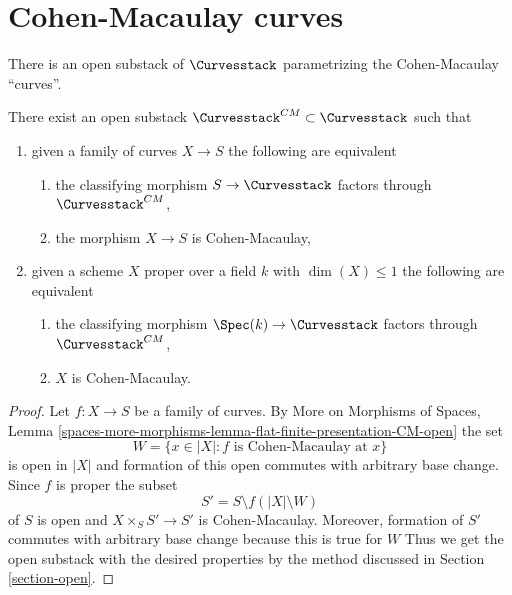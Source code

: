 \section{Cohen-Macaulay curves}
\label{section-CM}

\noindent
There is an open substack of $\Curvesstack$ parametrizing
the Cohen-Macaulay ``curves''.

\begin{lemma}
\label{lemma-CM-curves}
There exist an open substack $\Curvesstack^{CM} \subset \Curvesstack$
such that
\begin{enumerate}
\item given a family of curves $X \to S$ the following are equivalent
\begin{enumerate}
\item the classifying morphism $S \to \Curvesstack$ factors
through $\Curvesstack^{CM}$,
\item the morphism $X \to S$ is Cohen-Macaulay,
\end{enumerate}
\item given a scheme $X$ proper over a field $k$ with $\dim(X) \leq 1$
the following are equivalent
\begin{enumerate}
\item the classifying morphism $\Spec(k) \to \Curvesstack$ factors
through $\Curvesstack^{CM}$,
\item $X$ is Cohen-Macaulay.
\end{enumerate}
\end{enumerate}
\end{lemma}

\begin{proof}
Let $f : X \to S$ be a family of curves. By
More on Morphisms of Spaces, Lemma
\ref{spaces-more-morphisms-lemma-flat-finite-presentation-CM-open}
the set
$$
W = \{x \in |X| : f \text{ is Cohen-Macaulay at }x\}
$$
is open in $|X|$ and formation of this open commutes with arbitrary
base change. Since $f$ is proper the subset
$$
S' = S \setminus f(|X| \setminus W)
$$
of $S$ is open and $X \times_S S' \to S'$ is Cohen-Macaulay.
Moreover, formation of $S'$ commutes with arbitrary base
change because this is true for $W$
Thus we get the open substack with the desired properties
by the method discussed in Section \ref{section-open}.
\end{proof}

